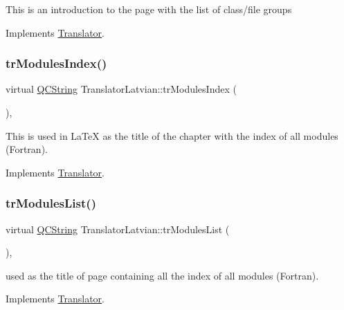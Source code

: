 This is an introduction to the page with the list of class/file groups 

Implements \mbox{\hyperlink{class_translator}{Translator}}.

\mbox{\label{class_translator_latvian_a22bbe030d98d4f055d9b42a60e163816}} 
\subsubsection{\texorpdfstring{trModulesIndex()}{trModulesIndex()}}
{\footnotesize\ttfamily virtual \mbox{\hyperlink{class_q_c_string}{Q\+C\+String}} Translator\+Latvian\+::tr\+Modules\+Index (\begin{DoxyParamCaption}{ }\end{DoxyParamCaption})\hspace{0.3cm}{\ttfamily [inline]}, {\ttfamily [virtual]}}

This is used in La\+TeX as the title of the chapter with the index of all modules (Fortran). 

Implements \mbox{\hyperlink{class_translator}{Translator}}.

\mbox{\label{class_translator_latvian_aea1d2c7afa2ad24f23016f547b7a53fc}} 
\subsubsection{\texorpdfstring{trModulesList()}{trModulesList()}}
{\footnotesize\ttfamily virtual \mbox{\hyperlink{class_q_c_string}{Q\+C\+String}} Translator\+Latvian\+::tr\+Modules\+List (\begin{DoxyParamCaption}{ }\end{DoxyParamCaption})\hspace{0.3cm}{\ttfamily [inline]}, {\ttfamily [virtual]}}

used as the title of page containing all the index of all modules (Fortran). 

Implements \mbox{\hyperlink{class_translator}{Translator}}.

\mbox{\label{class_translator_latvian_a945e00c8b53c4d356cd2dfa054d28a9e}} 
